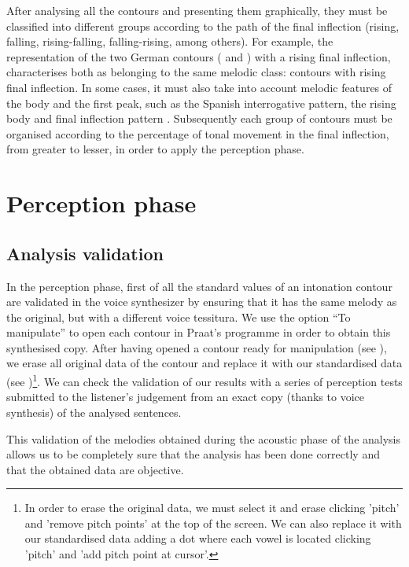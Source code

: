 \documentclass[output=paper]{langscibook}
\begin{document}
After analysing all the contours and presenting them graphically, they must be classified into different groups according to the path of the final inflection (rising, falling, rising-falling, falling-rising, among others). For example, the representation of the two German contours ( and ) with a rising final inflection, characterises both as belonging to the same melodic class: contours with rising final inflection. In some cases, it must also take into account melodic features of the body and the first peak, such as the Spanish interrogative pattern, the rising body and final inflection pattern \citep{FontRotches.2013b}. Subsequently each group of contours must be organised according to the percentage of tonal movement in the final inflection, from greater to lesser, in order to apply the perception phase.

\section{Perception phase}
\subsection{Analysis validation} 
\label{sec:font:4.1}

In the perception phase, first of all the standard values of an intonation contour are validated in the voice synthesizer by ensuring that it has the same melody as the original, but with a different voice tessitura. We use the option ``To manipulate'' to open each contour in Praat’s programme in order to obtain this synthesised copy. After having opened a contour ready for manipulation (see ), we erase all original data of the contour and replace it with our standardised data (see )\footnote{In order to erase the original data, we must select it and erase clicking 'pitch' and 'remove pitch points' at the top of the screen. We can also replace it with our standardised data adding a dot where each vowel is located clicking 'pitch' and 'add pitch point at cursor'.}. We can check the validation of our results with a series of perception tests submitted to the listener’s judgement from an exact copy (thanks to voice synthesis) of the analysed sentences.

This validation of the melodies obtained during the acoustic phase of the analysis allows us to be completely sure that the analysis has been done correctly and that the obtained data are objective.
\end{document}
